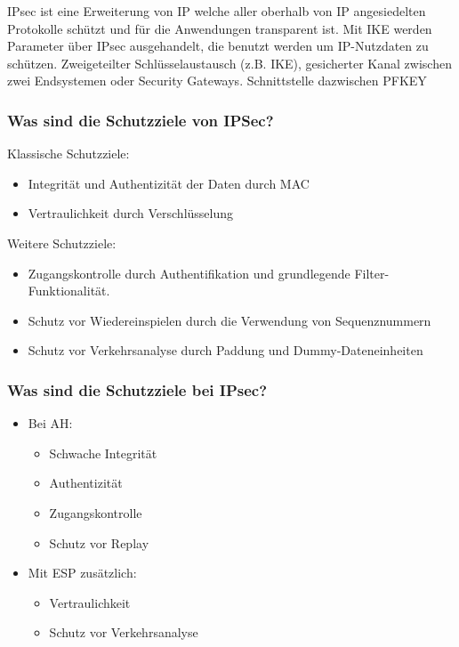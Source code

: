 	IPsec ist eine Erweiterung von IP welche aller oberhalb von IP angesiedelten Protokolle schützt und für die Anwendungen transparent ist. Mit IKE werden Parameter über IPsec ausgehandelt, die benutzt werden um IP-Nutzdaten zu schützen.
Zweigeteilter Schlüsselaustausch (z.B. IKE), gesicherter Kanal zwischen zwei Endsystemen oder Security Gateways. Schnittstelle dazwischen PF\textunderscore KEY %
	
	\subsubsection{Was sind die Schutzziele von IPSec?}
	Klassische Schutzziele:
	\begin{itemize}
		\item Integrität und Authentizität der Daten durch MAC
		\item Vertraulichkeit durch Verschlüsselung
	\end{itemize}
	Weitere Schutzziele:
	\begin{itemize}
		\item Zugangskontrolle durch Authentifikation und grundlegende Filter-Funktionalität.
		\item Schutz vor Wiedereinspielen durch die Verwendung von Sequenznummern
		\item Schutz vor Verkehrsanalyse durch Paddung und Dummy-Dateneinheiten
	\end{itemize}
	
		\subsubsection{Was sind die Schutzziele bei IPsec?}
	\begin{itemize}
		\item Bei AH: 
			\begin{itemize}
				\item Schwache Integrität %
				\item Authentizität
				\item Zugangskontrolle
				\item Schutz vor Replay
			\end{itemize}
		\item Mit ESP zusätzlich:
			\begin{itemize}
				\item Vertraulichkeit
				\item Schutz vor Verkehrsanalyse
			\end{itemize}
	\end{itemize}
	
